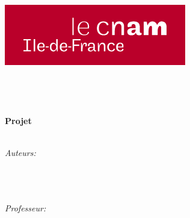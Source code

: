 
\begin{titlepage}

\newcommand{\HRule}{\rule{\linewidth}{0.5mm}} %

\center %

  
 \textsc{\LARGE{\color{bluePoli}{Conservatoire National des Arts et Métiers} }}\\[1.5cm] %
\includegraphics[scale=0.8]{Images/logocnam.png}\\[1cm] %
\Large{\textbf{\color{bluePoli}{\title}}}\\[0.5cm] %
\fontsize{0.3cm}{0.5cm}\selectfont \bfseries \textsc{\color{bluePoli} \\ \course}\\[0.5cm] %

  
  {\color{bluePoli}{\HRule }}\\[0.4cm]
{ \huge \bfseries Projet}\\[0.4cm] %
{\color{bluePoli}{\HRule}}\\[1.5cm]

  
 \begin{minipage}{0.4\textwidth}
\large
\emph{Auteurs:}\\
\authora\\[3mm]
\authorb\\[3mm]
\authorc\\[3mm]
\end{minipage}
\hfill
\begin{minipage}{0.4\textwidth}
 \large
\emph{Professeur:}\\
\advisor\\[3mm]
\\[3mm]
\\[3mm]
\end{minipage}\\[2cm] 




\end{titlepage}
